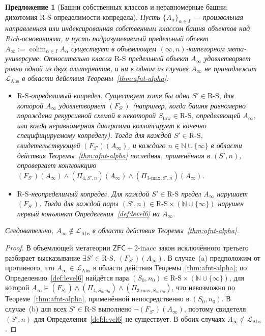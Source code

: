 \documentclass[11pt]{article}
\theoremstyle{plain}
\newtheorem{proposition}[theorem]{Предложение}
\theoremstyle{definition}
\newcommand{\RS}{\mathrm{R\text{-}S}}
\newcommand{\LAbs}{\mathcal{L}_{\mathrm{Abs}}}
\newcommand{\ZFC}{\mathsf{ZFC}}
\DeclareMathOperator{\colim}{colim}
\begin{document}
\begin{proposition}[Башни собственных классов и неравномерные башни: дихотомия $\RS$-определимости копредела]\label{prop:proper-class}
Пусть $\{A_\alpha\}_{\alpha \in I}$ — произвольная направленная или индексированная собственным классом башня объектов над Rich-основаниями, и пусть подразумеваемый предельный объект $A_\infty := \colim_{\alpha \in I} A_\alpha$ существует в объемлющем $(\infty, n)$-категорном мета-универсуме. Относительно класса $\RS$ предельный объект $A_\infty$ удовлетворяет ровно одной из двух альтернатив, и ни в одном из случаев $A_\infty$ не принадлежит $\LAbs$ в области действия Теоремы~\ref{thm:afnt-alpha}:
\begin{itemize}
\item[\textbf{(a)}] \emph{$\RS$-определимый копредел.} Существует хотя бы одна $S' \in \RS$, для которой $A_\infty$ удовлетворяет $(F_{S'})$ (например, когда башня равномерно порождена рекурсивной схемой в некоторой $S_{\mathrm{tow}} \in \RS$, определяющей $A_\infty$, или когда неравномерная диаграмма коллапсирует к конечно специфицируемому копределу). Тогда для каждой $S' \in \RS$, свидетельствующей $(F_{S'})(A_\infty)$, и каждого $n \in \mathbb{N} \cup \{\infty\}$ в области действия Теоремы~\ref{thm:afnt-alpha} последняя, применённая в $(S', n)$, опровергает конъюнкцию $(F_{S'})(A_\infty) \wedge (\Pi_{4, S', n})(A_\infty) \wedge (\Pi_{3\text{-max}, S', n})(A_\infty)$.
\item[\textbf{(b)}] \emph{$\RS$-неопределимый копредел.} Для каждой $S' \in \RS$ предел $A_\infty$ нарушает $(F_{S'})$. Тогда для каждой пары $(S', n) \in \RS \times (\mathbb{N} \cup \{\infty\})$ нарушен первый конъюнкт Определения~\ref{def:level6} на $A_\infty$.
\end{itemize}
Следовательно, $A_\infty \notin \LAbs$ в области действия Теоремы~\ref{thm:afnt-alpha}.
\end{proposition}

\begin{proof}
В объемлющей метатеории $\ZFC + 2\text{-inacc}$ закон исключённого третьего разбирает высказывание $\exists S' \in \RS,\ (F_{S'})(A_\infty)$. В случае~(a) предположим от противного, что $A_\infty \in \LAbs$ в области действия Теоремы~\ref{thm:afnt-alpha}; по Определению~\ref{def:level6} найдётся пара $(S_0, n_0) \in \RS \times (\mathbb{N} \cup \{\infty\})$, для которой $A_\infty \models (F_{S_0}) \wedge (\Pi_{4, S_0, n_0}) \wedge (\Pi_{3\text{-max}, S_0, n_0})$, что невозможно по Теореме~\ref{thm:afnt-alpha}, применённой непосредственно в $(S_0, n_0)$. В случае~(b) для всех $S' \in \RS$ выполнено $\neg(F_{S'})(A_\infty)$, поэтому свидетеля $(S', n)$ для Определения~\ref{def:level6} не существует. В обоих случаях $A_\infty \notin \LAbs$.
\end{proof}
\end{document}
